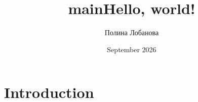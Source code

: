 \documentclass{article}
\title{main}
\author{Полина Лобанова}
\date{September 2026}
\begin{document}
\maketitle
\title{Hello, world!}

\section{Introduction}
\end{document}
